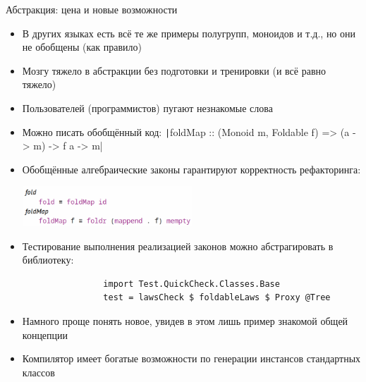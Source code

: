     \begin{frame}[fragile]{Абстракция: цена и новые возможности}
        \vspace{-0.5em}
        \begin{itemize}
            \item В других языках есть всё те же примеры полугрупп, моноидов и т.д., но они не обобщены (как правило)
            \item[\negative] Мозгу тяжело в абстракции без подготовки и тренировки (и всё равно тяжело)
            \item[\negative] Пользователей (программистов) пугают незнакомые слова
            \item[\positive] Можно писать обобщённый код: \texttt|foldMap :: (Monoid m, Foldable f) => (a -> m) -> f a -> m|
            \item[\positive] Обобщённые алгебраические законы гарантируют корректность рефакторинга:
            \begin{center}
                \includegraphics[width=0.5\textwidth]{figs/foldLaws}
            \end{center}
            \item[\positive] Тестирование выполнения реализацией законов можно абстрагировать в библиотеку:
            \begin{verbatim}
                import Test.QuickCheck.Classes.Base
                test = lawsCheck $ foldableLaws $ Proxy @Tree
            \end{verbatim}
            \item[\positive] Намного проще понять новое, увидев в этом лишь пример знакомой общей концепции
            \item[\positive] Компилятор имеет богатые возможности по генерации инстансов стандартных классов
        \end{itemize}
    \end{frame}



